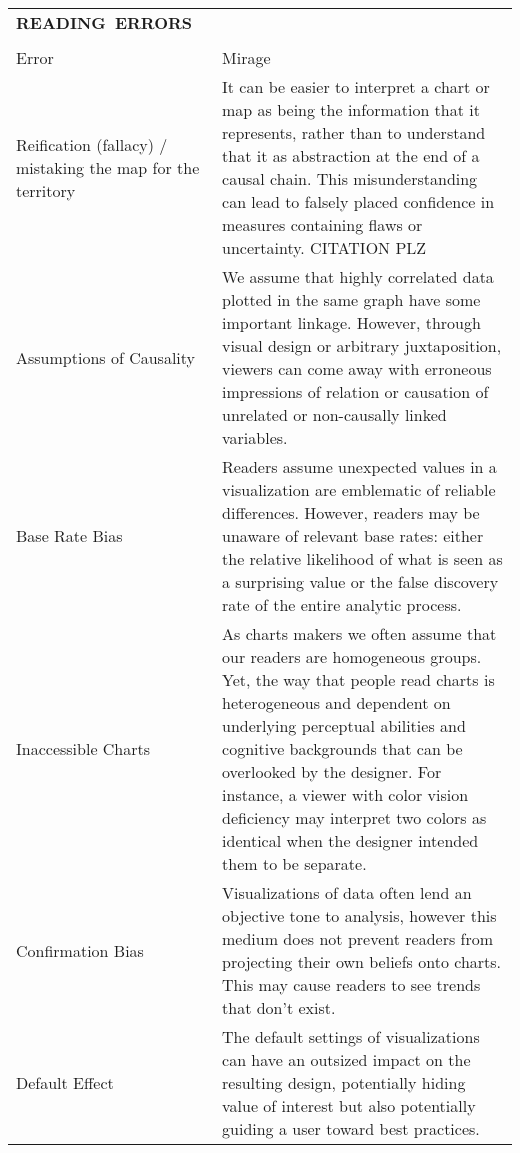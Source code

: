 \begin{longtable}{p{3cm}p{14cm}}
  \\\hbox{\normalsize{\textbf{READING ERRORS}}}&\\ \\
  \normalsize{Error} & \normalsize{Mirage}\\ \hline
   \rowcolor{colord}Reification (fallacy) / mistaking the map for the territory  & It can be easier to interpret a chart or map as being the information that it represents, rather than to understand that it as abstraction at the end of a causal chain. This misunderstanding can lead to falsely placed confidence in measures containing flaws or uncertainty.  CITATION PLZ\\
 \rowcolor{colord-opaque}Assumptions of Causality & We assume that highly correlated data plotted in the same graph have some important linkage. However, through visual design or arbitrary juxtaposition, viewers can come away with erroneous impressions of relation or causation of unrelated or non-causally linked variables. \cite{xiong2019illusion, few2019loom}\\
 \rowcolor{colord}Base Rate Bias & Readers assume unexpected values in a visualization are emblematic of reliable differences. However, readers may be unaware of relevant base rates: either the relative likelihood of what is seen as a surprising value or the false discovery rate of the entire analytic process. \cite{correll2016surprise,pu2018garden, zgraggen2018investigating}\\
 \rowcolor{colord-opaque}Inaccessible Charts & As charts makers we often assume that our readers are homogeneous groups. Yet, the way that people read charts is heterogeneous and dependent on underlying perceptual abilities and cognitive backgrounds that can be overlooked by the designer. For instance, a viewer with color vision deficiency may interpret two colors as identical when the designer intended them to be separate. \cite{lundgard2019Sociotechnical, plaisant2005information}\\
 \rowcolor{colord}Confirmation Bias & Visualizations of data often lend an objective tone to analysis, however this medium does not prevent readers from projecting their own beliefs onto charts. This may cause readers to see trends that don't exist. \cite{valdez2017framework, few2019loom}\\
 \rowcolor{colord-opaque}Default Effect & The default settings of visualizations can have an outsized impact on the resulting design, potentially hiding value of interest but also potentially guiding a user toward best practices. \cite{shah2006policy,few2019loom, hullman2011visualization}\\

\end{longtable}
